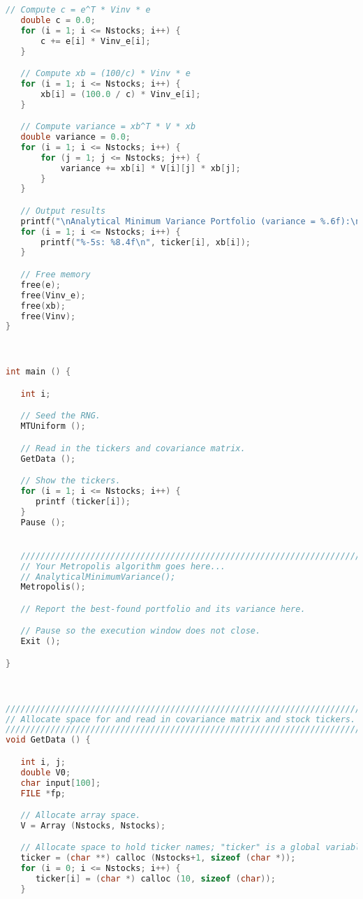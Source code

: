 \documentclass{report}
\begin{document}
\begin{lstlisting}[language=C++]
   // Compute c = e^T * Vinv * e
   double c = 0.0;
   for (i = 1; i <= Nstocks; i++) {
       c += e[i] * Vinv_e[i];
   }

   // Compute xb = (100/c) * Vinv * e
   for (i = 1; i <= Nstocks; i++) {
       xb[i] = (100.0 / c) * Vinv_e[i];
   }

   // Compute variance = xb^T * V * xb
   double variance = 0.0;
   for (i = 1; i <= Nstocks; i++) {
       for (j = 1; j <= Nstocks; j++) {
           variance += xb[i] * V[i][j] * xb[j];
       }
   }

   // Output results
   printf("\nAnalytical Minimum Variance Portfolio (variance = %.6f):\n", variance);
   for (i = 1; i <= Nstocks; i++) {
       printf("%-5s: %8.4f\n", ticker[i], xb[i]);
   }

   // Free memory
   free(e);
   free(Vinv_e);
   free(xb);
   free(Vinv);
}



int main () {

   int i;

   // Seed the RNG.
   MTUniform ();

   // Read in the tickers and covariance matrix.
   GetData ();

   // Show the tickers.
   for (i = 1; i <= Nstocks; i++) {
      printf (ticker[i]);
   }
   Pause ();


   /////////////////////////////////////////////////////////////////////////////
   // Your Metropolis algorithm goes here...
   // AnalyticalMinimumVariance();
   Metropolis();

   // Report the best-found portfolio and its variance here.

   // Pause so the execution window does not close.
   Exit ();

}



////////////////////////////////////////////////////////////////////////////////
// Allocate space for and read in covariance matrix and stock tickers.
////////////////////////////////////////////////////////////////////////////////
void GetData () {

   int i, j;
   double V0;
   char input[100];
   FILE *fp;

   // Allocate array space.
   V = Array (Nstocks, Nstocks);

   // Allocate space to hold ticker names; "ticker" is a global variable.
   ticker = (char **) calloc (Nstocks+1, sizeof (char *));
   for (i = 0; i <= Nstocks; i++) {
      ticker[i] = (char *) calloc (10, sizeof (char));
   }


\end{lstlisting}
\end{document}
